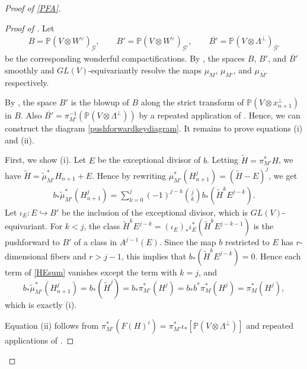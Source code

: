 \documentclass[12pt]{amsart}
\newcommand{\mb}{\mathbb}
\newcommand{\wt}{\widetilde}
\theoremstyle{plain}
\theoremstyle{definition}
\theoremstyle{remark}
\begin{document}
\begin{proof}[Proof of \cref{PFA}]
\begin{proof}[Proof of ]
Let 
\begin{align*}
B = \mb{P}(V \otimes W^\vee)_\mathcal{G}, \qquad 
B' = \mb{P}(V \otimes W^\vee)_\mathcal{G'} , \qquad
\overline{B'} = \mb{P}(V \otimes \Lambda^\perp)_{\overline{\mathcal{G'}}}
\end{align*} be the corresponding wonderful compactifications.
By , the spaces $B$, $B'$, and $\overline{B'}$ smoothly and $GL(V)$-equivariantly resolve the maps $\mu_M$, $\mu_{M'}$, and $\mu_{\overline{M'}}$ respectively.

By , the space $B'$ is the blowup of $B$ along the strict transform of $\mb{P}(V \otimes x_{n+1}^\perp)$ in $B$. Also $\overline{B'} = \pi_{M'}^{-1}(\mb{P}(V \otimes \Lambda^\perp))$ by a repeated application of . Hence, we can construct the diagram \eqref{pushforwardkeydiagram}. It remains to prove equations (i) and (ii).

First, we show (i). Let $E$ be the exceptional divisor of $b$. Letting $\wt{H} = \pi_{M'}^* H$, we have $\wt{H}=\wt{\mu}_{M'}^{*}H_{n+1}+E$. Hence by rewriting $\mu_{M'}^{*}(H_{n+1}^j)= (\wt{H}-E)^j$, we get
\begin{align}
b_{*}\wt{\mu}_{M'}^{*}(H_{n+1}^j)=\sum_{k=0}^{j}(-1)^{j-k}\binom{j}{k}b_*(\wt{H}^{k}E^{j-k}). \label{HEsum}
\end{align}
Let $ \iota_E : E \hookrightarrow B'$ be the inclusion of the exceptional divisor, which is $GL(V)$-equivariant. For $k<j$, the class $\wt{H}^{k}E^{j-k}=(\iota_E)_* \iota_E^* (\wt{H}^{k}E^{j-k-1})$ is the pushforward to $B'$ of a class in $A^{j-1}(E)$. Since the map $b$ restricted to $E$ has $r$-dimensional fibers and $r > j-1$, this implies that $b_{*}(\wt{H}^{k}E^{j-k}) = 0$. Hence each term of \eqref{HEsum} vanishes except the term with $k=j$, and
\[
b_{*}\wt{\mu}_{M'}^{*}(H_{n+1}^j) = b_* (\wt{H}^j) = b_* \pi_{M'}^* (H^j) = b_* b^* \pi_{M}^* (H^j) = \pi_{M}^* (H^j),
\]
which is exactly (i).

Equation (ii) follows from $\pi_{M'}^{*} (F(H)^i) = \pi_{M'}^{*} \iota_*[\mb{P}(V \otimes \Lambda^\perp)]$ and repeated applications of .
\end{proof}


\end{proof}
\end{document}

